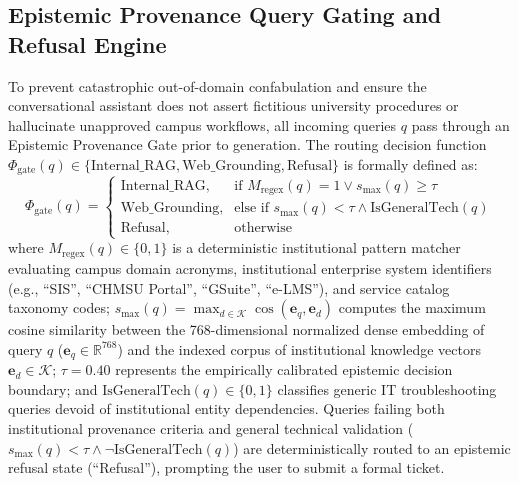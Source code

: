 \documentclass[conference]{IEEEtran}
\begin{document}
\subsection{Epistemic Provenance Query Gating and Refusal Engine}
To prevent catastrophic out-of-domain confabulation and ensure the conversational assistant does not assert fictitious university procedures or hallucinate unapproved campus workflows, all incoming queries $q$ pass through an Epistemic Provenance Gate prior to generation. The routing decision function $\Phi_{\text{gate}}(q) \in \{\text{Internal\_RAG}, \text{Web\_Grounding}, \text{Refusal}\}$ is formally defined as:
\begin{equation}
\Phi_{\text{gate}}(q) = \begin{cases} 
\text{Internal\_RAG}, & \text{if } M_{\text{regex}}(q) = 1 \lor s_{\max}(q) \ge \tau \\ 
\text{Web\_Grounding}, & \text{else if } s_{\max}(q) < \tau \land \text{IsGeneralTech}(q) \\ 
\text{Refusal}, & \text{otherwise} 
\end{cases}
\end{equation}
where $M_{\text{regex}}(q) \in \{0, 1\}$ is a deterministic institutional pattern matcher evaluating campus domain acronyms, institutional enterprise system identifiers (e.g., ``SIS'', ``CHMSU Portal'', ``GSuite'', ``e-LMS''), and service catalog taxonomy codes; $s_{\max}(q) = \max_{d \in \mathcal{K}} \cos(\mathbf{e}_q, \mathbf{e}_d)$ computes the maximum cosine similarity between the 768-dimensional normalized dense embedding of query $q$ ($\mathbf{e}_q \in \mathbb{R}^{768}$) and the indexed corpus of institutional knowledge vectors $\mathbf{e}_d \in \mathcal{K}$; $\tau = 0.40$ represents the empirically calibrated epistemic decision boundary; and $\text{IsGeneralTech}(q) \in \{0, 1\}$ classifies generic IT troubleshooting queries devoid of institutional entity dependencies. Queries failing both institutional provenance criteria and general technical validation ($s_{\max}(q) < \tau \land \neg \text{IsGeneralTech}(q)$) are deterministically routed to an epistemic refusal state (``Refusal''), prompting the user to submit a formal ticket.
\end{document}
